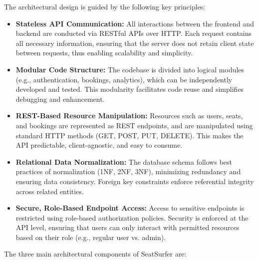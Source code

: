 \documentclass[12pt,a4paper]{report}
\begin{document}
\noindent
The architectural design is guided by the following key principles:

\begin{itemize}
    \item \textbf{Stateless API Communication:} All interactions between the frontend and backend are conducted via RESTful APIs over HTTP. Each request contains all necessary information, ensuring that the server does not retain client state between requests, thus enabling scalability and simplicity.

    \item \textbf{Modular Code Structure:} The codebase is divided into logical modules (e.g., authentication, bookings, analytics), which can be independently developed and tested. This modularity facilitates code reuse and simplifies debugging and enhancement.

    \item \textbf{REST-Based Resource Manipulation:} Resources such as users, seats, and bookings are represented as REST endpoints, and are manipulated using standard HTTP methods (GET, POST, PUT, DELETE). This makes the API predictable, client-agnostic, and easy to consume.

    \item \textbf{Relational Data Normalization:} The database schema follows best practices of normalization (1NF, 2NF, 3NF), minimizing redundancy and ensuring data consistency. Foreign key constraints enforce referential integrity across related entities.

    \item \textbf{Secure, Role-Based Endpoint Access:} Access to sensitive endpoints is restricted using role-based authorization policies. Security is enforced at the API level, ensuring that users can only interact with permitted resources based on their role (e.g., regular user vs. admin).
\end{itemize}

\noindent
The three main architectural components of SeatSurfer are:
\end{document}
